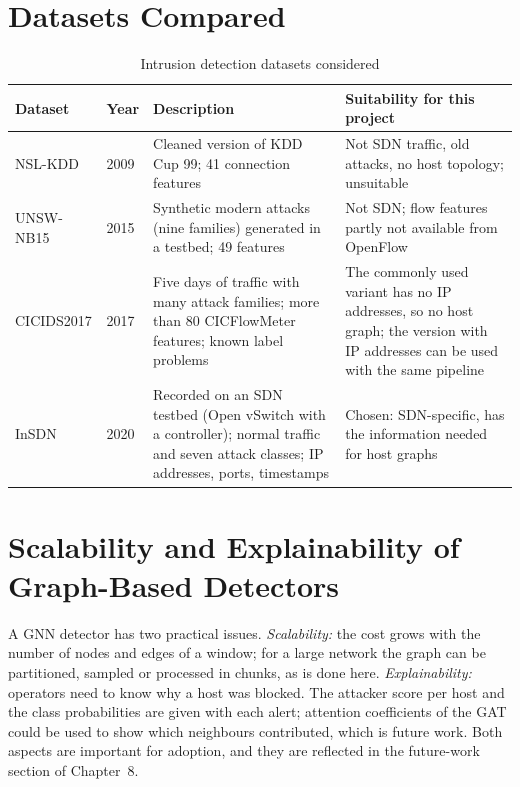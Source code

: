 \section{Datasets Compared}
\begin{table}[htbp]
\centering
\caption{Intrusion detection datasets considered}
\label{tab:datasets}
\small
\begin{tabularx}{\textwidth}{|p{2.5cm}|p{1.6cm}|X|X|}
\hline
\textbf{Dataset} & \textbf{Year} & \textbf{Description} & \textbf{Suitability for this project} \\ \hline
NSL-KDD \cite{bib:nslkdd} & 2009 & Cleaned version of KDD Cup 99; 41 connection features & Not SDN traffic, old attacks, no host topology; unsuitable \\ \hline
UNSW-NB15 \cite{bib:unsw} & 2015 & Synthetic modern attacks (nine families) generated in a testbed; 49 features & Not SDN; flow features partly not available from OpenFlow \\ \hline
CICIDS2017 \cite{bib:cicids} & 2017 & Five days of traffic with many attack families; more than 80 CICFlowMeter features; known label problems \cite{bib:engelen} & The commonly used variant has no IP addresses, so no host graph; the version with IP addresses can be used with the same pipeline \\ \hline
InSDN \cite{bib:insdn} & 2020 & Recorded on an SDN testbed (Open vSwitch with a controller); normal traffic and seven attack classes; IP addresses, ports, timestamps & Chosen: SDN-specific, has the information needed for host graphs \\ \hline
\end{tabularx}
\end{table}

\section{Scalability and Explainability of Graph-Based Detectors}
A GNN detector has two practical issues. \emph{Scalability:} the cost grows with the number of nodes and edges of a window; for a large network the graph can be partitioned, sampled or processed in chunks, as is done here. \emph{Explainability:} operators need to know why a host was blocked. The attacker score per host and the class probabilities are given with each alert; attention coefficients of the GAT could be used to show which neighbours contributed, which is future work. Both aspects are important for adoption, and they are reflected in the future-work section of Chapter~8.


